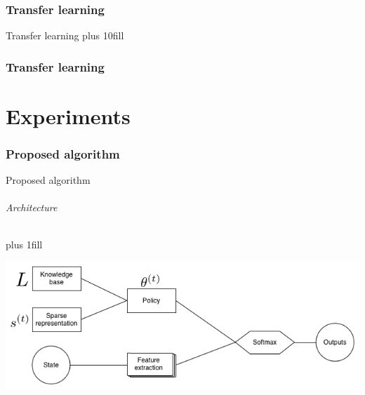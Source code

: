 \documentclass{beamer}
\begin{document}
\section{Transfer learning}
\begin{frame}[fragile]{Transfer learning}
\vskip0pt plus 10fill
\begin{center}
\end{center}
\end{frame}

\section{Transfer learning}

\part{Experiments}
\section{Proposed algorithm}
\begin{frame}[fragile]{Proposed algorithm}
\framesubtitle{Architecture}
\vskip0pt plus 1fill
\begin{center}
    \includegraphics[width=\linewidth]{knowledge_transfer.png}
\end{center}
\end{frame}
\end{document}
